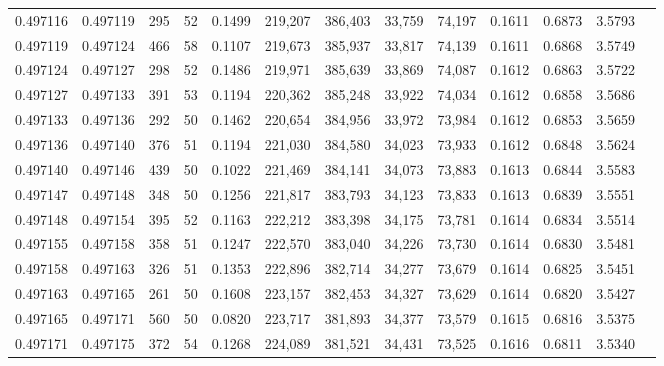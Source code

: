 \begin{tabular}{rrrrrrrrrrrrr}
0.497116 & 0.497119 & 295 &  52 &                                     0.1499 & 219,207 & 386,403 &  33,759 &  74,197 & 0.1611 & 0.6873 & 3.5793 \\
0.497119 & 0.497124 & 466 &  58 &                                     0.1107 & 219,673 & 385,937 &  33,817 &  74,139 & 0.1611 & 0.6868 & 3.5749 \\
0.497124 & 0.497127 & 298 &  52 &                                     0.1486 & 219,971 & 385,639 &  33,869 &  74,087 & 0.1612 & 0.6863 & 3.5722 \\
0.497127 & 0.497133 & 391 &  53 &                                     0.1194 & 220,362 & 385,248 &  33,922 &  74,034 & 0.1612 & 0.6858 & 3.5686 \\
0.497133 & 0.497136 & 292 &  50 &                                     0.1462 & 220,654 & 384,956 &  33,972 &  73,984 & 0.1612 & 0.6853 & 3.5659 \\
0.497136 & 0.497140 & 376 &  51 &                                     0.1194 & 221,030 & 384,580 &  34,023 &  73,933 & 0.1612 & 0.6848 & 3.5624 \\
0.497140 & 0.497146 & 439 &  50 &                                     0.1022 & 221,469 & 384,141 &  34,073 &  73,883 & 0.1613 & 0.6844 & 3.5583 \\
0.497147 & 0.497148 & 348 &  50 &                                     0.1256 & 221,817 & 383,793 &  34,123 &  73,833 & 0.1613 & 0.6839 & 3.5551 \\
0.497148 & 0.497154 & 395 &  52 &                                     0.1163 & 222,212 & 383,398 &  34,175 &  73,781 & 0.1614 & 0.6834 & 3.5514 \\
0.497155 & 0.497158 & 358 &  51 &                                     0.1247 & 222,570 & 383,040 &  34,226 &  73,730 & 0.1614 & 0.6830 & 3.5481 \\
0.497158 & 0.497163 & 326 &  51 &                                     0.1353 & 222,896 & 382,714 &  34,277 &  73,679 & 0.1614 & 0.6825 & 3.5451 \\
0.497163 & 0.497165 & 261 &  50 &                                     0.1608 & 223,157 & 382,453 &  34,327 &  73,629 & 0.1614 & 0.6820 & 3.5427 \\
0.497165 & 0.497171 & 560 &  50 &                                     0.0820 & 223,717 & 381,893 &  34,377 &  73,579 & 0.1615 & 0.6816 & 3.5375 \\
0.497171 & 0.497175 & 372 &  54 &                                     0.1268 & 224,089 & 381,521 &  34,431 &  73,525 & 0.1616 & 0.6811 & 3.5340 \\

\end{tabular}
